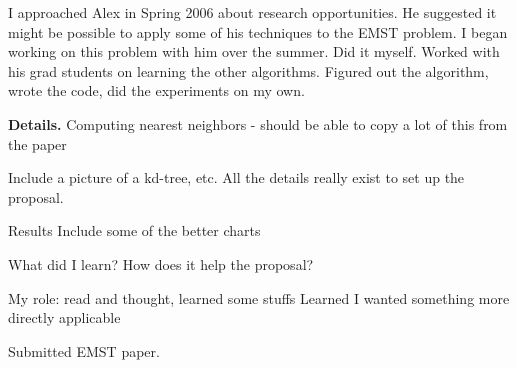 \documentclass[twoside,leqno, 12pt]{article}
\begin{document}
I approached Alex in Spring 2006 about research opportunities.  He suggested it might be possible to apply some of his techniques to the EMST problem.  I began working on this problem with him over the summer.  Did it myself.  Worked with his grad students on learning the other algorithms.  Figured out the algorithm, wrote the code, did the experiments on my own.


\textbf{Details.}
Computing nearest neighbors - should be able to copy a lot of this from the paper

Include a picture of a kd-tree, etc.  All the details really exist to set up the proposal.


Results
Include some of the better charts

What did I learn?  How does it help the proposal?

My role: read and thought, learned some stuffs
Learned I wanted something more directly applicable



Submitted EMST paper.




\end{document}
